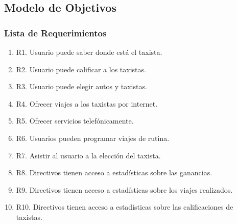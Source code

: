\subsection{Modelo de Objetivos}
\subsubsection{Lista de Requerimientos}
	\begin{enumerate}
		\item \label{req:R1}R1. Usuario puede saber donde está el taxista.		
		
		\item \label{req:R2}R2. Usuario puede calificar a los taxistas.		
		
		\item \label{req:R3}R3. Usuario puede elegir autos y taxistas.		
		
		\item \label{req:R4}R4. Ofrecer viajes a los taxistas por internet.		
		
		\item \label{req:R5}R5. Ofrecer servicios telefónicamente.		

		\item \label{req:R6}R6. Usuarios pueden programar viajes de 
		rutina.		
		
		\item \label{req:R7}R7. Asistir al usuario a la elección del taxista.		
		
		\item \label{req:R8}R8. Directivos tienen acceso a estadísticas sobre las ganancias.
		
		\item \label{req:R9}R9. Directivos tienen acceso a estadísticas sobre los viajes realizados.
		
		\item \label{req:R10}R10. Directivos tienen acceso a estadísticas sobre las calificaciones de taxistas.
	\end{enumerate}
